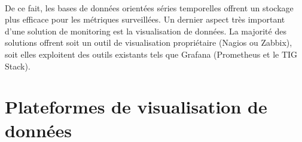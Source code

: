 ~

\noindent
De ce fait, les bases de données orientées séries temporelles offrent un stockage plus efficace pour les métriques surveillées. Un dernier aspect très important d’une solution de monitoring est la visualisation de données. La majorité des solutions offrent soit un outil de visualisation propriétaire (Nagios ou Zabbix), soit elles exploitent des outils existants tels que Grafana (Prometheus et le TIG Stack).




\section{Plateformes de visualisation de données}
